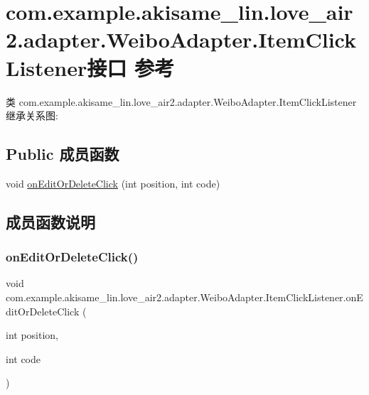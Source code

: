 \hypertarget{interfacecom_1_1example_1_1akisame__lin_1_1love__air2_1_1adapter_1_1_weibo_adapter_1_1_item_click_listener}{}\section{com.\+example.\+akisame\+\_\+lin.\+love\+\_\+air2.\+adapter.\+Weibo\+Adapter.\+Item\+Click\+Listener接口 参考}
\label{interfacecom_1_1example_1_1akisame__lin_1_1love__air2_1_1adapter_1_1_weibo_adapter_1_1_item_click_listener}


类 com.\+example.\+akisame\+\_\+lin.\+love\+\_\+air2.\+adapter.\+Weibo\+Adapter.\+Item\+Click\+Listener 继承关系图\+:
\subsection*{Public 成员函数}
\begin{DoxyCompactItemize}
\item 
void \mbox{\hyperlink{interfacecom_1_1example_1_1akisame__lin_1_1love__air2_1_1adapter_1_1_weibo_adapter_1_1_item_click_listener_a2145e004bc9a47973387ee114c1fdae1}{on\+Edit\+Or\+Delete\+Click}} (int position, int code)
\end{DoxyCompactItemize}


\subsection{成员函数说明}
\mbox{\label{interfacecom_1_1example_1_1akisame__lin_1_1love__air2_1_1adapter_1_1_weibo_adapter_1_1_item_click_listener_a2145e004bc9a47973387ee114c1fdae1}} 
\subsubsection{\texorpdfstring{onEditOrDeleteClick()}{onEditOrDeleteClick()}}
{\footnotesize\ttfamily void com.\+example.\+akisame\+\_\+lin.\+love\+\_\+air2.\+adapter.\+Weibo\+Adapter.\+Item\+Click\+Listener.\+on\+Edit\+Or\+Delete\+Click (\begin{DoxyParamCaption}\item[{int}]{position,  }\item[{int}]{code }\end{DoxyParamCaption})}



